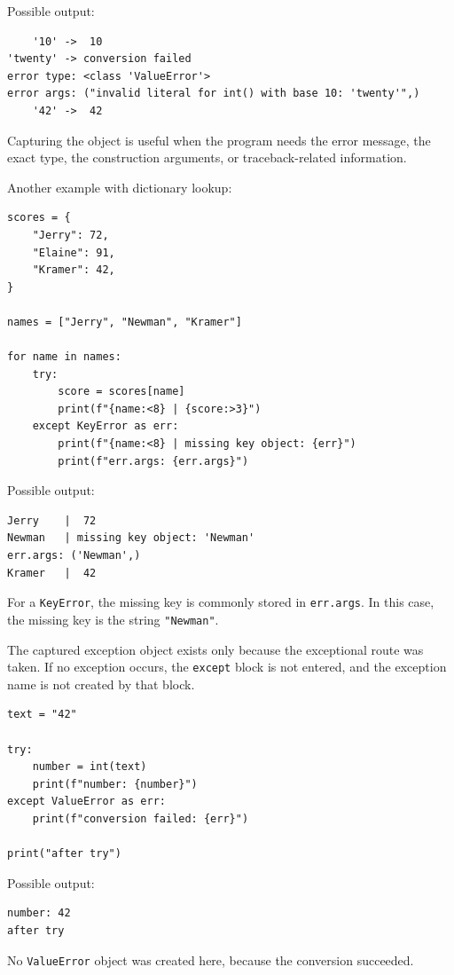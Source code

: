 \documentclass[a4paper,twoside]{report}
\begin{document}
Possible output:

\begin{verbatim}
    '10' ->  10
'twenty' -> conversion failed
error type: <class 'ValueError'>
error args: ("invalid literal for int() with base 10: 'twenty'",)
    '42' ->  42
\end{verbatim}

Capturing the object is useful when the program needs the error message, the exact type, the construction arguments, or traceback-related information.

Another example with dictionary lookup:

\begin{verbatim}
scores = {
    "Jerry": 72,
    "Elaine": 91,
    "Kramer": 42,
}

names = ["Jerry", "Newman", "Kramer"]

for name in names:
    try:
        score = scores[name]
        print(f"{name:<8} | {score:>3}")
    except KeyError as err:
        print(f"{name:<8} | missing key object: {err}")
        print(f"err.args: {err.args}")
\end{verbatim}

Possible output:

\begin{verbatim}
Jerry    |  72
Newman   | missing key object: 'Newman'
err.args: ('Newman',)
Kramer   |  42
\end{verbatim}

For a \texttt{KeyError}, the missing key is commonly stored in \texttt{err.args}. In this case, the missing key is the string \texttt{"Newman"}.

The captured exception object exists only because the exceptional route was taken. If no exception occurs, the \texttt{except} block is not entered, and the exception name is not created by that block.

\begin{verbatim}
text = "42"

try:
    number = int(text)
    print(f"number: {number}")
except ValueError as err:
    print(f"conversion failed: {err}")

print("after try")
\end{verbatim}

Possible output:

\begin{verbatim}
number: 42
after try
\end{verbatim}

No \texttt{ValueError} object was created here, because the conversion succeeded.
\end{document}
